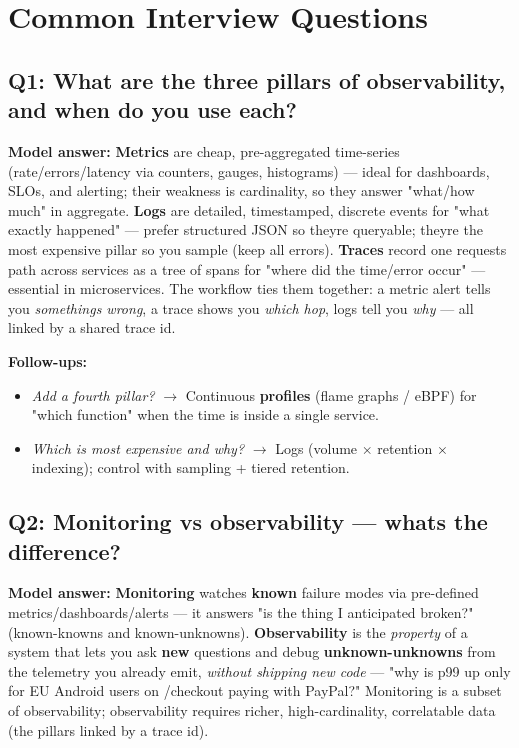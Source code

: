 \documentclass[11pt]{article}
\providecommand{\tightlist}{\setlength{\itemsep}{1pt}\setlength{\parskip}{0pt}}
\begin{document}
\section{Common Interview Questions}\label{common-interview-questions}

\subsection{Q1: What are the three pillars of observability, and when do you use each?}\label{q1-what-are-the-three-pillars-of-observability-and-when-do-you-use-each}

\textbf{Model answer:} \textbf{Metrics} are cheap, pre-aggregated time-series (rate/errors/latency via counters, gauges, histograms) --- ideal for dashboards, SLOs, and alerting; their weakness is cardinality, so they answer "what/how much" in aggregate. \textbf{Logs} are detailed, timestamped, discrete events for "what exactly happened" --- prefer structured JSON so they\textquotesingle re queryable; they\textquotesingle re the most expensive pillar so you sample (keep all errors). \textbf{Traces} record one request\textquotesingle s path across services as a tree of spans for "where did the time/error occur" --- essential in microservices. The workflow ties them together: a metric alert tells you \emph{something\textquotesingle s wrong}, a trace shows you \emph{which hop}, logs tell you \emph{why} --- all linked by a shared trace id.

\textbf{Follow-ups:}

\begin{itemize}
\tightlist
\item
  \emph{Add a fourth pillar?} \(\rightarrow\) Continuous \textbf{profiles} (flame graphs / eBPF) for "which function" when the time is inside a single service.
\item
  \emph{Which is most expensive and why?} \(\rightarrow\) Logs (volume \(\times\) retention \(\times\) indexing); control with sampling + tiered retention.
\end{itemize}

\subsection{Q2: Monitoring vs observability --- what\textquotesingle s the difference?}\label{q2-monitoring-vs-observability--whats-the-difference}

\textbf{Model answer:} \textbf{Monitoring} watches \textbf{known} failure modes via pre-defined metrics/dashboards/alerts --- it answers "is the thing I anticipated broken?" (known-knowns and known-unknowns). \textbf{Observability} is the \emph{property} of a system that lets you ask \textbf{new} questions and debug \textbf{unknown-unknowns} from the telemetry you already emit, \emph{without shipping new code} --- "why is p99 up only for EU Android users on /checkout paying with PayPal?" Monitoring is a subset of observability; observability requires richer, high-cardinality, correlatable data (the pillars linked by a trace id).
\end{document}
